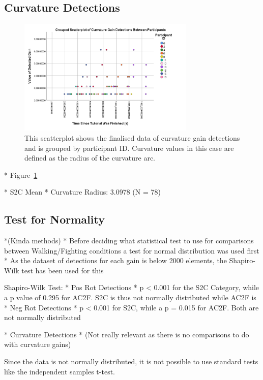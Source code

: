 \subsection{Curvature Detections}
\begin{figure}[tbph]
    \centering
    \includegraphics[width=0.75\textwidth]{figures/graphs/CurvatureDetectionScatter.png}
    \caption[Finalised Detection Scatterplot For Curvature Gains, Grouped by Participant ID]{This scatterplot shows the finalised data of curvature gain detections and is grouped by participant ID. Curvature values in this case are defined as the radius of the curvature arc.}
    \label{fig:curvatureDetectionData}
\end{figure}
* Figure~\ref{fig:curvatureDetectionData}


* S2C Mean
   * Curvature Radius: 3.0978 (N = 78)



\subsection{Test for Normality}
*(Kinda methods)
   * Before deciding what statistical test to use for comparisons between Walking/Fighting conditions a test for normal distribution was used first
   * As the dataset of detections for each gain is below 2000 elements, the Shapiro-Wilk test has been used for this

Shapiro-Wilk Test:
   * Pos Rot Detections
      * p < 0.001 for the S2C Category, while a p value of 0.295 for AC2F. S2C is thus not normally distributed while AC2F is
   * Neg Rot Detections
      * p < 0.001 for S2C, while a p = 0.015 for AC2F. Both are not normally distributed
      
   * Curvature Detections
      * (Not really relevant as there is no comparisons to do with curvature gains)

Since the data is not normally distributed, it is not possible to use standard tests like the independent samples t-test.
   
